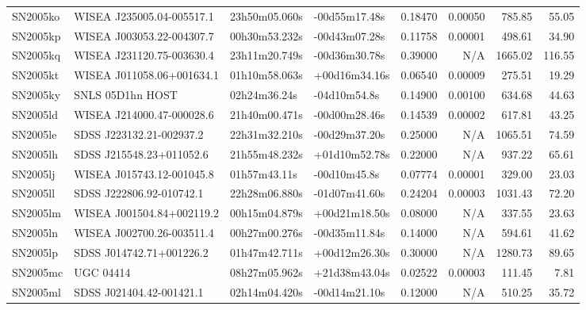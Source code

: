 \begin{longtable}{llllrrrr}
SN2005ko         &       WISEA J235005.04-005517.1 &   23h50m05.060s &   -00d55m17.48s &  0.18470 &  0.00050 &   785.85 &       55.05 \\
SN2005kp         &       WISEA J003053.22-004307.7 &   00h30m53.232s &   -00d43m07.28s &  0.11758 &  0.00001 &   498.61 &       34.90 \\
SN2005kq         &       WISEA J231120.75-003630.4 &   23h11m20.749s &   -00d36m30.78s &  0.39000 &      N/A &  1665.02 &      116.55 \\
SN2005kt         &       WISEA J011058.06+001634.1 &   01h10m58.063s &   +00d16m34.16s &  0.06540 &  0.00009 &   275.51 &       19.29 \\
SN2005ky         &                SNLS 05D1hn HOST &    02h24m36.24s &    -04d10m54.8s &  0.14900 &  0.00100 &   634.68 &       44.63 \\
SN2005ld         &       WISEA J214000.47-000028.6 &   21h40m00.471s &   -00d00m28.46s &  0.14539 &  0.00002 &   617.81 &       43.25 \\
SN2005le         &        SDSS J223132.21-002937.2 &   22h31m32.210s &   -00d29m37.20s &  0.25000 &      N/A &  1065.51 &       74.59 \\
SN2005lh         &        SDSS J215548.23+011052.6 &   21h55m48.232s &   +01d10m52.78s &  0.22000 &      N/A &   937.22 &       65.61 \\
SN2005lj         &       WISEA J015743.12-001045.8 &    01h57m43.11s &    -00d10m45.8s &  0.07774 &  0.00001 &   329.00 &       23.03 \\
SN2005ll         &        SDSS J222806.92-010742.1 &   22h28m06.880s &   -01d07m41.60s &  0.24204 &  0.00003 &  1031.43 &       72.20 \\
SN2005lm         &       WISEA J001504.84+002119.2 &   00h15m04.879s &   +00d21m18.50s &  0.08000 &      N/A &   337.55 &       23.63 \\
SN2005ln         &       WISEA J002700.26-003511.4 &   00h27m00.276s &   -00d35m11.84s &  0.14000 &      N/A &   594.61 &       41.62 \\
SN2005lp         &        SDSS J014742.71+001226.2 &   01h47m42.711s &   +00d12m26.30s &  0.30000 &      N/A &  1280.73 &       89.65 \\
SN2005mc         &                       UGC 04414 &   08h27m05.962s &   +21d38m43.04s &  0.02522 &  0.00003 &   111.45 &        7.81 \\
SN2005ml         &        SDSS J021404.42-001421.1 &   02h14m04.420s &   -00d14m21.10s &  0.12000 &      N/A &   510.25 &       35.72 \\

\end{longtable}
